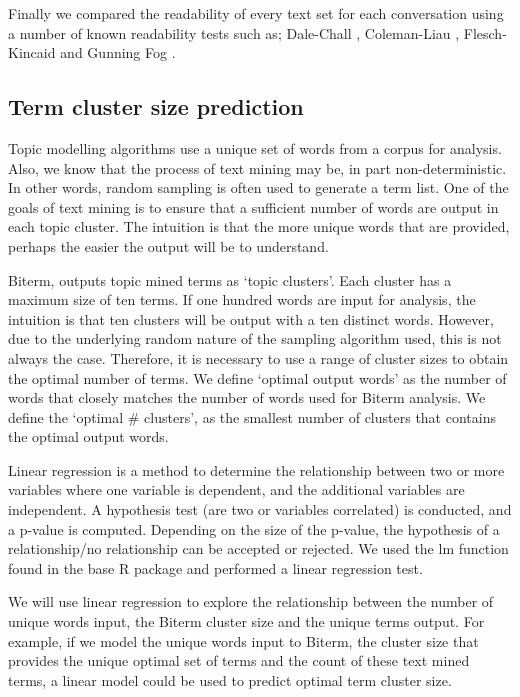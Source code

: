 Finally we compared the readability of every text set for each conversation using a number of known readability tests such as; Dale-Chall \cite{dale1948formula}, Coleman-Liau \cite{coleman1975computer}, Flesch-Kincaid \cite{kincaid1975derivation} and Gunning Fog \cite{gunning1952technique}. 

\subsection{Term cluster size prediction}

Topic modelling algorithms use a unique set of words from a corpus for analysis. Also, we know that the process of text mining may be, in part non-deterministic. In other words, random sampling is often used to generate a term list. One of the goals of text mining is to ensure that a sufficient number of words are output in each topic cluster. The intuition is that the more unique words that are provided, perhaps the easier the output will be to understand.

Biterm, outputs topic mined terms as `topic clusters'. Each cluster has a maximum size of ten terms. If one hundred words are input for analysis, the intuition is that ten clusters will be output with a ten distinct words. However, due to the underlying random nature of the sampling algorithm used, this is not always the case. Therefore, it is necessary to use a range of cluster sizes to obtain the optimal number of terms. We define `optimal output words' as the number of words that closely matches the number of words used for Biterm analysis. We define the `optimal \# clusters', as the smallest number of clusters that contains the optimal output words.

Linear regression is a method to determine the relationship between two or more variables where one variable is dependent, and the additional variables are independent. A hypothesis test (are two or variables correlated) is conducted, and a p-value is computed. Depending on the size of the p-value, the hypothesis of a relationship/no relationship can be accepted or rejected. We used the lm function found in the base R package \cite{lmR} and performed a linear regression test.

We will use linear regression to explore the relationship between the number of unique words input, the Biterm cluster size and the unique terms output. For example, if we model the unique words input to Biterm, the cluster size that provides the unique optimal set of terms and the count of these text mined terms, a linear model could be used to predict optimal term cluster size.

